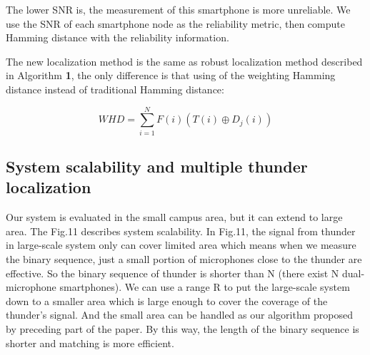 The lower SNR is, the measurement of this smartphone is more unreliable.   
We use the SNR of each smartphone node as the reliability metric, then compute Hamming distance with the reliability information.

The new localization method is the same as robust localization method described in Algorithm \textbf{1}, 
the only difference is that using of the weighting Hamming distance instead of traditional Hamming distance:

\begin{equation}
WHD = \sum\limits_{i = 1}^N {F(i) \left( T(i) \oplus D_j(i)\right)}
\end{equation}


\subsection{System scalability and multiple thunder localization}
 Our system is evaluated in the small campus area, but it can extend to large area. The Fig.11 describes system scalability. 
In Fig.11, the signal from thunder in large-scale system only can cover limited area which means when we measure the binary sequence, 
 just a small portion of microphones close to the thunder are effective. 
 So the binary sequence of thunder is shorter than N (there exist N dual-microphone smartphones). 
We can use a range R to put the large-scale system down to a smaller area which is large enough to cover the coverage of the thunder's signal. 
And the small area can be handled as our algorithm proposed by preceding part of the paper. 
By this way, the length of the binary sequence is shorter and matching is more efficient.


